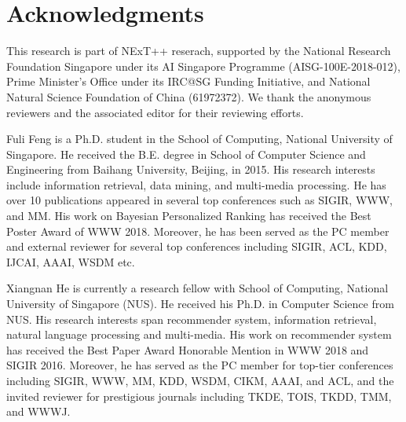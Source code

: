 \documentclass[10pt,journal,compsoc]{IEEEtran}
\begin{document}
\section*{Acknowledgments}
This research is part of NExT++ reserach, supported by the National Research Foundation Singapore under its AI Singapore Programme (AISG-100E-2018-012), Prime Minister's Office under its IRC@SG Funding Initiative, and National Natural Science Foundation of China (61972372). 
We thank the anonymous reviewers and the associated editor for their reviewing efforts. 


\vspace{-34pt}
\begin{IEEEbiography}
{Fuli Feng} is a Ph.D. student in the School of Computing, National University of Singapore. He received the B.E. degree in School of Computer Science and Engineering from Baihang University, Beijing, in 2015. His research interests include information retrieval, data mining, and multi-media processing. He has over 10 publications appeared in several top conferences such as SIGIR, WWW, and MM. His work on Bayesian Personalized Ranking has received the Best Poster Award of WWW 2018. Moreover, he has been served as the PC member and external reviewer for several top conferences including SIGIR, ACL, KDD, IJCAI, AAAI, WSDM etc.
\end{IEEEbiography}

\vspace{-35pt}
\begin{IEEEbiography}
{Xiangnan He} is currently a research fellow with School of Computing, National University of Singapore (NUS). He received his Ph.D. in Computer Science from NUS. His research interests span recommender system, information retrieval, natural language processing and multi-media. His work on recommender system has received the Best Paper Award Honorable Mention in WWW 2018 and SIGIR 2016. Moreover, he has served as the PC member for top-tier conferences including SIGIR, WWW, MM, KDD, WSDM, CIKM, AAAI, and ACL, and the invited reviewer for prestigious journals including TKDE, TOIS, TKDD, TMM, and WWWJ. \end{IEEEbiography}
\vspace{-30pt}
\end{document}
